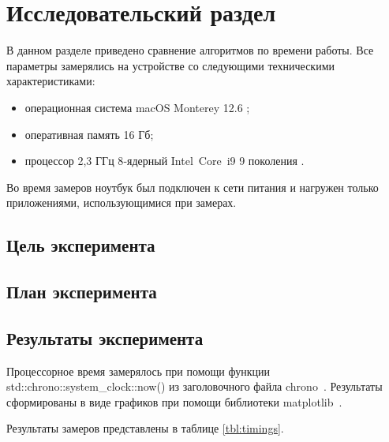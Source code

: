 \chapter{Исследовательский раздел}
\label{cha:research}

В данном разделе приведено сравнение алгоритмов по времени работы.
Все параметры замерялись на устройстве со следующими техническими характеристиками:
\begin{itemize}
	\item операционная система macOS Monterey 12.6 \cite{monterey};
	\item оперативная память 16 Гб;
	\item процессор 2,3 ГГц 8‑ядерный Intel Core i9 9 поколения \cite{intel}.
\end{itemize}

Во время замеров ноутбук был подключен к сети питания и нагружен только приложениями, использующимися при замерах.

\section{Цель эксперимента}

\section{План эксперимента}

\section{Результаты эксперимента}

Процессорное время замерялось при помощи функции std::chrono::system\_clock::now() из заголовочного файла chrono~\cite{cplusplus}. Результаты сформированы в виде графиков при помощи библиотеки matplotlib~\cite{matplotlib}. 

Результаты замеров представлены в таблице \ref{tbl:timings}.

